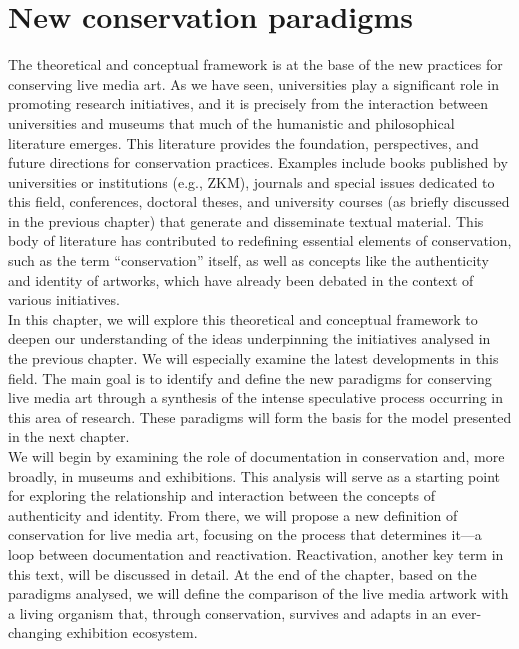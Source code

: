 \chapter{\label{ch:2-new_conservation_paradigms}New conservation paradigms}
The theoretical and conceptual framework is at the base of the new practices for conserving live media art. As we have seen, universities play a significant role in promoting research initiatives, and it is precisely from the interaction between universities and museums that much of the humanistic and philosophical literature emerges. This literature provides the foundation, perspectives, and future directions for conservation practices. Examples include books published by universities or institutions (e.g., ZKM), journals and special issues dedicated to this field, conferences, doctoral theses, and university courses (as briefly discussed in the previous chapter) that generate and disseminate textual material. This body of literature has contributed to redefining essential elements of conservation, such as the term “conservation” itself, as well as concepts like the authenticity and identity of artworks, which have already been debated in the context of various initiatives.\\
In this chapter, we will explore this theoretical and conceptual framework to deepen our understanding of the ideas underpinning the initiatives analysed in the previous chapter. We will especially examine the latest developments in this field. The main goal is to identify and define the new paradigms for conserving live media art through a synthesis of the intense speculative process occurring in this area of research. These paradigms will form the basis for the model presented in the next chapter.\\
We will begin by examining the role of documentation in conservation and, more broadly, in museums and exhibitions. This analysis will serve as a starting point for exploring the relationship and interaction between the concepts of authenticity and identity. From there, we will propose a new definition of conservation for live media art, focusing on the process that determines it—a loop between documentation and reactivation. Reactivation, another key term in this text, will be discussed in detail. At the end of the chapter, based on the paradigms analysed, we will define the comparison of the live media artwork with a living organism that, through conservation, survives and adapts in an ever-changing exhibition ecosystem.  

